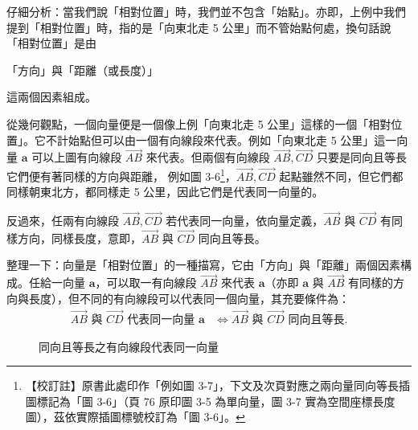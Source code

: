 仔細分析：當我們說「相對位置」時，我們並不包含「始點」。亦即，上例中我們提到「相對位置」時，指的是「向東北走 5 公里」而不管始點何處，換句話說「相對位置」是由
\begin{center}
「方向」與「距離（或長度）」
\end{center}
這兩個因素組成。

從幾何觀點，一個向量便是一個像上例「向東北走 5 公里」這樣的一個「相對位置」。它不計始點但可以由一個有向線段來代表。例如「向東北走 5 公里」這一向量 $\mathbf{a}$ 可以上圖有向線段 $\vec{AB}$ 來代表。但兩個有向線段 $\vec{AB}, \vec{CD}$ 只要是同向且等長它們便有著同樣的方向與距離，\label{note:b3-ch3-p76-fig-ref}%
例如圖 3-6\footnote{【校訂註】原書此處印作「例如圖 3-7」，下文及次頁對應之兩向量同向等長插圖標記為「圖 3-6」（頁 76 原印圖 3-5 為單向量，圖 3-7 實為空間座標長度圖），茲依實際插圖標號校訂為「圖 3-6」。}，$\vec{AB}, \vec{CD}$ 起點雖然不同，但它們都同樣朝東北方，都同樣走 5 公里，因此它們是代表同一向量的。

反過來，任兩有向線段 $\vec{AB}, \vec{CD}$ 若代表同一向量，依向量定義，$\vec{AB}$ 與 $\vec{CD}$ 有同樣方向，同樣長度，意即，$\vec{AB}$ 與 $\vec{CD}$ 同向且等長。

整理一下：向量是「相對位置」的一種描寫，它由「方向」與「距離」兩個因素構成。任給一向量 $\mathbf{a}$，可以取一有向線段 $\vec{AB}$ 來代表 $\mathbf{a}$（亦即 $\mathbf{a}$ 與 $\vec{AB}$ 有同樣的方向與長度），但不同的有向線段可以代表同一個向量，其充要條件為：
\begin{align*}
\vec{AB} \text{ 與 } \vec{CD} \text{ 代表同一向量 } \mathbf{a} &\iff \vec{AB} \text{ 與 } \vec{CD} \text{ 同向且等長}.
\end{align*}

\begin{figure}[H]
\centering
{}
\caption{同向且等長之有向線段代表同一向量}
\label{fig:b3-fig3-6}
\end{figure}

